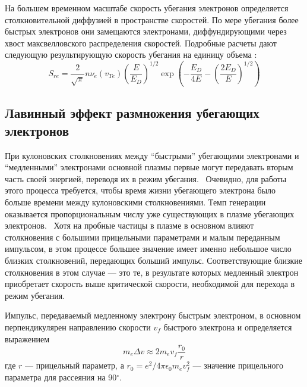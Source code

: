 На большем временном масштабе скорость убегания электронов определяется столкновительной диффузией в пространстве скоростей. По мере убегания более быстрых электронов они замещаются электронами, диффундирующими через хвост максвелловского распределения скоростей. Подробные расчеты дают следующую результирующую скорость убегания на единицу объема \cite{Wesson2004}: 
\begin{equation*}
  S_{re} = \frac{2}{ \sqrt{\pi} } n \nu_{e}(v_{Te}) \left( \frac{E}{E_D} \right)^{1/2} \exp\left( -\frac{E_D}{4 E} - \left( \frac{2 E_D }{E} \right)^{1/2} \right)
\end{equation*}



\subsection{Лавинный эффект размножения убегающих электронов}

При кулоновских столкновениях между ``быстрыми'' убегающими электронами и ``медленными'' электронами основной плазмы первые могут передавать вторым часть своей энергией, переводя их в режим убегания.~\cite{Sokolov1979} Очевидно, для работы этого процесса требуется, чтобы время жизни убегающего электрона было больше времени между кулоновскими столкновениями. Темп генерации оказывается пропорциональным числу уже существующих в плазме убегающих электронов.~\cite{Rozansky2012}  Хотя на пробные частицы в плазме в основном влияют столкновения с большими прицельными параметрами и малым переданным импульсом, в этом процессе большее значение имеет именно небольшое число близких столкновений, передающих больший импульс. Соответствующие близкие столкновения в этом случае --- это те, в результате которых медленный электрон приобретает скорость выше критической скорости, необходимой для перехода в режим убегания. 

Импульс, передаваемый медленному электрону быстрым электроном, в основном перпендикулярен направлению скорости $v_f$ быстрого электрона и определяется выражением
\begin{equation*}
  m_e \Delta v \approx 2 m_e v_f \frac{r_0}{r}
\end{equation*}
где $r$ --- прицельный параметр, а $r_0 = e^2 / 4 \pi \epsilon_0 m_e v_f^2$ --- значение прицельного параметра для рассеяния на 90$^\circ$.~\cite{Wesson2004}

